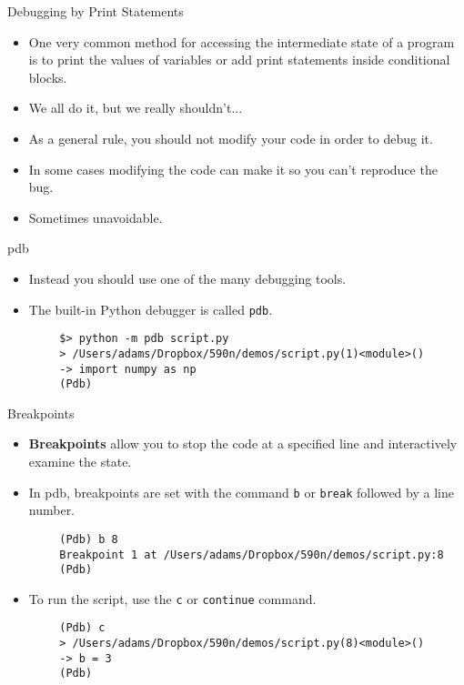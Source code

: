 \documentclass[serif,xcolor=pdftex,dvipsnames,table,hyperref={bookmarks=false,breaklinks}]{beamer}
\begin{document}
\begin{frame}[t]{Debugging by Print Statements}
	\begin{itemize}[<+->]
		\item One very common method for accessing the intermediate state of a program is to print the values of variables or add print statements inside conditional blocks.
		\item We all do it, but we really shouldn't...
		\item As a general rule, you should not modify your code in order to debug it.
		\item In some cases modifying the code can make it so you can't reproduce the bug.
		\item Sometimes unavoidable.
	\end{itemize}
\end{frame}


\begin{frame}[t,fragile]{pdb}
	\begin{itemize}[<+->]
		\item Instead you should use one of the many debugging tools.
		\item The built-in Python debugger is called \verb|pdb|.
	\end{itemize}
	\pause
	\begin{lstlisting}
		$> python -m pdb script.py
		> /Users/adams/Dropbox/590n/demos/script.py(1)<module>()
		-> import numpy as np
		(Pdb) 
	\end{lstlisting}
\end{frame}

\begin{frame}[t,fragile]{Breakpoints}
	\begin{itemize}[<+->]
		\item \textbf{Breakpoints} allow you to stop the code at a specified line and interactively examine the state.
		\item In pdb, breakpoints are set with the command \verb|b| or \verb|break| followed by a line number.
	\end{itemize}
	\pause
	\begin{lstlisting}
		(Pdb) b 8
		Breakpoint 1 at /Users/adams/Dropbox/590n/demos/script.py:8
		(Pdb)
	\end{lstlisting}
	\pause
	\begin{itemize}[<+->]
		\item To run the script, use the \verb|c| or \verb|continue| command.
	\end{itemize}
	\pause
	\begin{lstlisting}
		(Pdb) c
		> /Users/adams/Dropbox/590n/demos/script.py(8)<module>()
		-> b = 3
		(Pdb)
	\end{lstlisting}

\end{frame}
\end{document}

